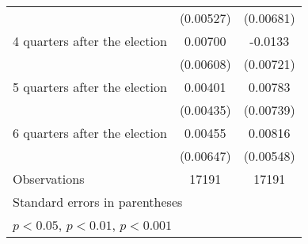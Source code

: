 \begin{table}[htbp]
\begin{tabular}{l*{2}{c}}
                    &   (0.00527)         &   (0.00681)         \\
[1em]
 4 quarters after the election&     0.00700         &     -0.0133         \\
                    &   (0.00608)         &   (0.00721)         \\
[1em]
 5 quarters after the election&     0.00401         &     0.00783         \\
                    &   (0.00435)         &   (0.00739)         \\
[1em]
 6 quarters after the election&     0.00455         &     0.00816         \\
                    &   (0.00647)         &   (0.00548)         \\
\hline
Observations        &       17191         &       17191         \\
\hline\hline
\multicolumn{3}{l}{\footnotesize Standard errors in parentheses}\\
\multicolumn{3}{l}{\footnotesize \sym{*} \(p<0.05\), \sym{**} \(p<0.01\), \sym{***} \(p<0.001\)}\\
\end{tabular}
\end{table}
